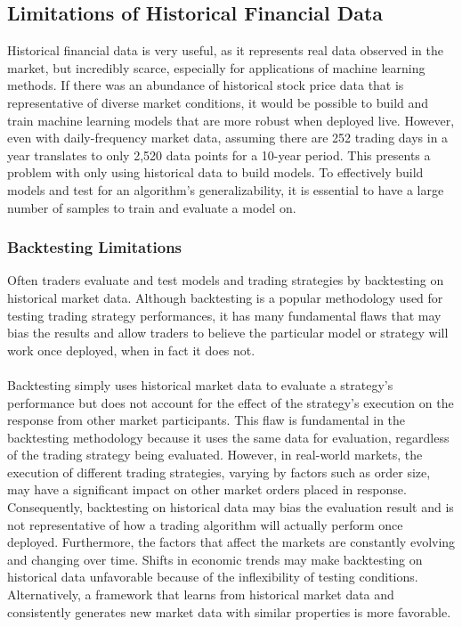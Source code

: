 \subsection{Limitations of Historical Financial Data}
Historical financial data is very useful, as it represents real data observed in the market, but incredibly scarce, especially for applications of machine learning methods. If there was an abundance of historical stock price data that is representative of diverse market conditions, it would be possible to build and train machine learning models that are more robust when deployed live. However, even with daily-frequency market data, assuming there are 252 trading days in a year translates to only 2,520 data points for a 10-year period. This presents a problem with only using historical data to build models. To effectively build models and test for an algorithm's generalizability, it is essential to have a large number of samples to train and evaluate a model on.

\subsubsection{Backtesting Limitations}
Often traders evaluate and test models and trading strategies by backtesting on historical market data. Although backtesting is a popular methodology used for testing trading strategy performances, it has many fundamental flaws that may bias the results and allow traders to believe the particular model or strategy will work once deployed, when in fact it does not.
\\
\\
Backtesting simply uses historical market data to evaluate a strategy's performance but does not account for the effect of the strategy's execution on the response from other market participants. This flaw is fundamental in the backtesting methodology because it uses the same data for evaluation, regardless of the trading strategy being evaluated. However, in real-world markets, the execution of different trading strategies, varying by factors such as order size, may have a significant impact on other market orders placed in response. Consequently, backtesting on historical data may bias the evaluation result and is not representative of how a trading algorithm will actually perform once deployed. Furthermore, the factors that affect the markets are constantly evolving and changing over time. Shifts in economic trends may make backtesting on historical data unfavorable because of the inflexibility of testing conditions. Alternatively, a framework that learns from historical market data and consistently generates new market data with similar properties is more favorable.

